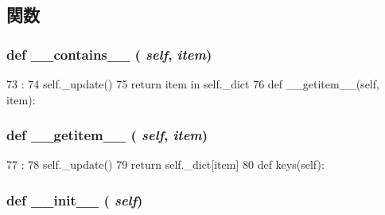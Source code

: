 \subsection{関数}
\hypertarget{classm5_1_1debug_1_1AllFlags_a31ecdf34e79a47aea99a17eea32b7ac2}{
\subsubsection[{\_\-\_\-contains\_\-\_\-}]{\setlength{\rightskip}{0pt plus 5cm}def \_\-\_\-contains\_\-\_\- ( {\em self}, \/   {\em item})}}
\label{classm5_1_1debug_1_1AllFlags_a31ecdf34e79a47aea99a17eea32b7ac2}



\begin{DoxyCode}
73                                 :
74         self._update()
75         return item in self._dict
76 
    def __getitem__(self, item):
\end{DoxyCode}
\hypertarget{classm5_1_1debug_1_1AllFlags_a50d766f4276c3d8fe330ac8cd344a75f}{
\subsubsection[{\_\-\_\-getitem\_\-\_\-}]{\setlength{\rightskip}{0pt plus 5cm}def \_\-\_\-getitem\_\-\_\- ( {\em self}, \/   {\em item})}}
\label{classm5_1_1debug_1_1AllFlags_a50d766f4276c3d8fe330ac8cd344a75f}



\begin{DoxyCode}
77                                :
78         self._update()
79         return self._dict[item]
80 
    def keys(self):
\end{DoxyCode}
\hypertarget{classm5_1_1debug_1_1AllFlags_ac775ee34451fdfa742b318538164070e}{
\subsubsection[{\_\-\_\-init\_\-\_\-}]{\setlength{\rightskip}{0pt plus 5cm}def \_\-\_\-init\_\-\_\- ( {\em self})}}
\label{classm5_1_1debug_1_1AllFlags_ac775ee34451fdfa742b318538164070e}



